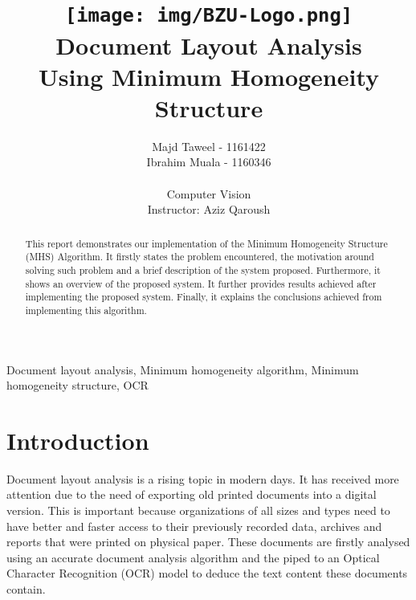 \documentclass[conference]{IEEEtran}
\begin{document}
    \title{
        \texttt{[image: img/BZU-Logo.png]}\\
        Document Layout Analysis\\
        \footnotesize Using Minimum Homogeneity Structure
    }

    \author{
        {Majd Taweel - 1161422}\\
        {Ibrahim Muala - 1160346}\\\\

        {Computer Vision}\\
        {Instructor: Aziz Qaroush}
    }
    \maketitle

    \begin{abstract}
    This report demonstrates our implementation of the Minimum Homogeneity Structure (MHS) Algorithm.
    It firstly states the problem encountered, the motivation around solving such problem and a brief description
    of the system proposed.
    Furthermore, it shows an overview of the proposed system.
    It further provides results achieved after implementing the proposed system.
    Finally, it explains the conclusions achieved from implementing this algorithm.
    \end{abstract}

    \begin{IEEEkeywords}
    Document layout analysis, Minimum homogeneity algorithm, Minimum homogeneity structure, OCR
    \end{IEEEkeywords}

    \section{Introduction}

    Document layout analysis is a rising topic in modern days.
    It has received more attention due to the need of exporting old printed documents into a digital version.
    This is important because organizations of all sizes and types need to have better and faster
    access to their previously recorded data, archives and reports that were printed on physical paper.
    These documents are firstly analysed using an accurate document analysis algorithm and the piped to an
    Optical Character Recognition (OCR) model to deduce the text content these documents contain.
\end{document}
